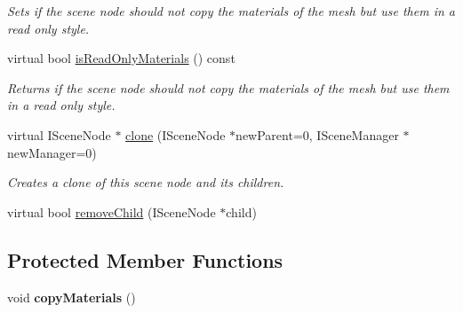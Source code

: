 \begin{DoxyCompactItemize}
\begin{DoxyCompactList}\small\item\em Sets if the scene node should not copy the materials of the mesh but use them in a read only style. \end{DoxyCompactList}\item 
\hypertarget{classirr_1_1scene_1_1_c_mesh_scene_node_aacd92b5c71e65ea0fd3dc386193a4b71}{virtual bool \hyperlink{classirr_1_1scene_1_1_c_mesh_scene_node_aacd92b5c71e65ea0fd3dc386193a4b71}{is\-Read\-Only\-Materials} () const }\label{classirr_1_1scene_1_1_c_mesh_scene_node_aacd92b5c71e65ea0fd3dc386193a4b71}

\begin{DoxyCompactList}\small\item\em Returns if the scene node should not copy the materials of the mesh but use them in a read only style. \end{DoxyCompactList}\item 
\hypertarget{classirr_1_1scene_1_1_c_mesh_scene_node_a2f2aed412683517e0279121ba5a68750}{virtual I\-Scene\-Node $\ast$ \hyperlink{classirr_1_1scene_1_1_c_mesh_scene_node_a2f2aed412683517e0279121ba5a68750}{clone} (I\-Scene\-Node $\ast$new\-Parent=0, I\-Scene\-Manager $\ast$new\-Manager=0)}\label{classirr_1_1scene_1_1_c_mesh_scene_node_a2f2aed412683517e0279121ba5a68750}

\begin{DoxyCompactList}\small\item\em Creates a clone of this scene node and its children. \end{DoxyCompactList}\item 
virtual bool \hyperlink{classirr_1_1scene_1_1_c_mesh_scene_node_a2d3ae3d065b23d4f04969702e771911d}{remove\-Child} (I\-Scene\-Node $\ast$child)
\end{DoxyCompactItemize}
\subsection*{Protected Member Functions}
\begin{DoxyCompactItemize}
\item 
\hypertarget{classirr_1_1scene_1_1_c_mesh_scene_node_a9970090e33c97fcbd0d4cb1254d224e1}{void {\bfseries copy\-Materials} ()}\label{classirr_1_1scene_1_1_c_mesh_scene_node_a9970090e33c97fcbd0d4cb1254d224e1}

\end{DoxyCompactItemize}
